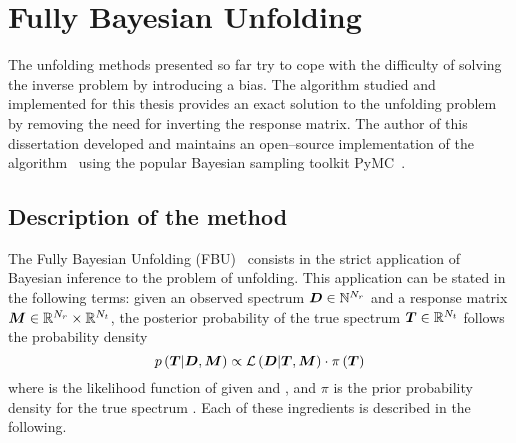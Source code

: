 \section{Fully Bayesian Unfolding}
\label{sec:fbu}

The unfolding methods presented so far try to cope with the difficulty
of solving the inverse problem by introducing a bias. The algorithm
studied and implemented for this thesis provides an exact solution to
the unfolding problem by removing the need for inverting the response
matrix. The author of this dissertation developed and maintains an
open--source implementation of the algorithm~\cite{pyfbu} using the
popular Bayesian sampling toolkit
PyMC~\cite{Patil:Huard:Fonnesbeck:2010:JSSOBK:v35i04}. 

\subsection{Description of the method}

The Fully Bayesian Unfolding (FBU)~\cite{fbu} consists in the strict
application of Bayesian inference to the problem of unfolding. This
application can be stated in the following terms: given an observed
spectrum $\boldsymbol{D}\in\mathbb{N}^{N_r}$ and a response matrix
$\boldsymbol{M}\in\mathbb{R}{}^{N_r}\times{}\mathbb{R}{}^{N_t}$, the posterior
probability of the true spectrum $\boldsymbol{T}{}\in{}\mathbb{R}{}^{N_t}$ follows
the probability density
\begin{equation}
p\left(\boldsymbol{T}{}|\boldsymbol{D}{},\boldsymbol{M}{}\right)
\propto{}
\mathcal{L}\left(\boldsymbol{D}{}|\boldsymbol{T}{},\boldsymbol{M}{}\right)
\cdot{}
\pi{}\left(\boldsymbol{T}{}\right)
\end{equation}
where \conditionalLhood{\Data{}}{\Truth{},\TrasfMatrix{}} is the
likelihood function of \Data{} given \Truth{} and \TrasfMatrix{},
and $\pi{}$ is the prior probability density for the true spectrum
\Truth{}.
Each of these ingredients is described in the following.

